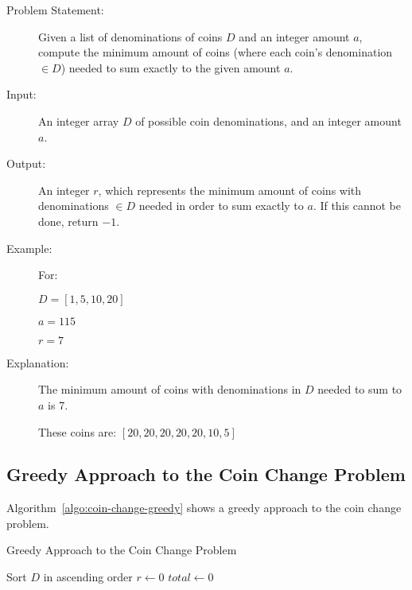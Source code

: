 \begin{description}
    \item[Problem Statement:]
        Given a list of denominations of coins $D$ and an integer amount $a$, compute the minimum amount of coins (where each coin's denomination $\in D$) needed to sum exactly to the given amount $a$.
        
    \item[Input:] 
        An integer array $D$ of possible coin denominations, and an integer amount $a$.
        
    \item[Output:] 
        An integer $r$, which represents the minimum amount of coins with denominations $\in D$ needed in order to sum exactly to $a$. If this cannot be done, return $-1$.
        
    \item[Example:]
        For: 

        $D = [1, 5, 10, 20]$

        $a = 115$

        $r = 7$

    \item[Explanation:]
        The minimum amount of coins with denominations in $D$ needed to sum to $a$ is 7.

        These coins are: $[20,20,20,20,20,10,5]$

\end{description}

\subsection{Greedy Approach to the Coin Change Problem}

Algorithm~\ref{algo:coin-change-greedy} shows a greedy approach to the coin change problem.

\begin{algorithm}[H]
    \caption{Greedy Approach to the Coin Change Problem}
    \label{algo:coin-change-greedy}
    Sort $D$ in ascending order\;
    $r \leftarrow 0$\;
    $total \leftarrow 0$\;
\end{algorithm}

